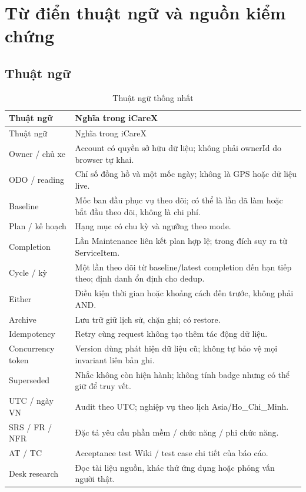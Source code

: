 \chapter{Từ điển thuật ngữ và nguồn kiểm chứng}
\section{Thuật ngữ}
\begin{smalltable}\begin{longtable}{L{3cm}L{11.8cm}}
\caption{Thuật ngữ thống nhất}\\\toprule Thuật ngữ & Nghĩa trong iCareX\\\midrule\endfirsthead
\toprule Thuật ngữ & Nghĩa trong iCareX\\\midrule\endhead
Owner / chủ xe & Account có quyền sở hữu dữ liệu; không phải ownerId do browser tự khai.\\
ODO / reading & Chỉ số đồng hồ và một mốc ngày; không là GPS hoặc dữ liệu live.\\
Baseline & Mốc ban đầu phục vụ theo dõi; có thể là lần đã làm hoặc bắt đầu theo dõi, không là chi phí.\\
Plan / kế hoạch & Hạng mục có chu kỳ và ngưỡng theo mode.\\
Completion & Lần Maintenance liên kết plan hợp lệ; trong đích suy ra từ ServiceItem.\\
Cycle / kỳ & Một lần theo dõi từ baseline/latest completion đến hạn tiếp theo; định danh ổn định cho dedup.\\
Either & Điều kiện thời gian hoặc khoảng cách đến trước, không phải AND.\\
Archive & Lưu trữ giữ lịch sử, chặn ghi; có restore.\\
Idempotency & Retry cùng request không tạo thêm tác động dữ liệu.\\
Concurrency token & Version dùng phát hiện dữ liệu cũ; không tự bảo vệ mọi invariant liên bản ghi.\\
Superseded & Nhắc không còn hiện hành; không tính badge nhưng có thể giữ để truy vết.\\
UTC / ngày VN & Audit theo UTC; nghiệp vụ theo lịch Asia/Ho\_Chi\_Minh.\\
SRS / FR / NFR & Đặc tả yêu cầu phần mềm / chức năng / phi chức năng.\\
AT / TC & Acceptance test Wiki / test case chi tiết của báo cáo.\\
Desk research & Đọc tài liệu nguồn, khác thử ứng dụng hoặc phỏng vấn người thật.\\\bottomrule
\end{longtable}\end{smalltable}

